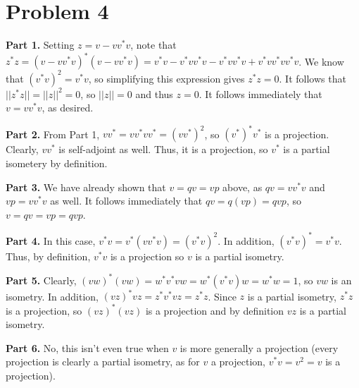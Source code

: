 \documentclass[aps,pra,showpacs,notitlepage,onecolumn,superscriptaddress,nofootinbib]{revtex4-1}
\theoremstyle{definition}
\begin{document}
\section{Problem 4}

\noindent \textbf{Part 1.} Setting $z = v - v v^{*} v$, note that $z^{*} z = (v - v v^{*} v)^{*}(v - v v^{*} v) = v^{*} v - v^{*} v v^{*} v - v^{*} v v^{*} v + v^{*} v v^{*} v v^{*} v$. We know that
$(v^{*} v)^2 = v^{*} v$, so simplifying this expression gives $z^{*} z = 0$. It follows that $||z^{*} z|| = ||z||^2 = 0$, so $||z|| = 0$ and thus $z = 0$. It follows immediately that $v = v v^{*} v$, as desired.
\newline

\noindent \textbf{Part 2.} From Part 1, $v v^{*} = v v^{*} v v^{*} = (v v^{*})^2$, so $(v^{*})^{*} v^{*}$ is a projection. Clearly, $v v^{*}$ is self-adjoint as well. Thus, it is a projection, so $v^{*}$ is a partial isometery by definition.
\newline

\noindent \textbf{Part 3.}  We have already shown that $v = qv = vp$ above, as $qv = v v^{*} v$ and $vp = v v^{*} v$ as well. It follows immediately that $qv = q(vp) = qvp$, so $v = qv = vp = qvp$.
\newline

\noindent \textbf{Part 4.} In this case, $v^{*} v = v^{*} (v v^{*} v) = (v^{*} v)^2$. In addition, $(v^{*} v)^{*} = v^{*} v$. Thus, by definition, $v^{*} v$ is a projection so $v$ is a partial isometry.
\newline

\noindent \textbf{Part 5.} Clearly, $(vw)^{*} (vw) = w^{*} v^{*} v w = w^{*} (v^{*} v) w = w^{*} w = 1$, so $vw$ is an isometry. In addition, $(vz)^{*} vz = z^{*} v^{*} v z = z^{*} z$. Since $z$ is a partial isometry, $z^{*} z$ is a projection,
so $(vz)^{*} (vz)$ is a projection and by definition $vz$ is a partial isometry.
\newline

\noindent \textbf{Part 6.} No, this isn't even true when $v$ is more generally a projection (every projection is clearly a partial isometry, as for $v$ a projection, $v^{*} v = v^2 = v$ is a projection).
\end{document}
